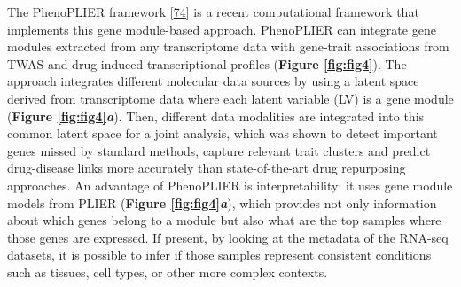 The PhenoPLIER framework {[}\protect\hyperlink{ref-NM3rHx1i}{74}{]} is a recent computational framework that implements this gene module-based approach.
PhenoPLIER can integrate gene modules extracted from any transcriptome data with gene-trait associations from TWAS and drug-induced transcriptional profiles (\textbf{Figure \ref{fig:fig4}}).
The approach integrates different molecular data sources by using a latent space derived from transcriptome data where each latent variable (LV) is a gene module (\textbf{Figure \ref{fig:fig4}\emph{a}}).
Then, different data modalities are integrated into this common latent space for a joint analysis, which was shown to detect important genes missed by standard methods, capture relevant trait clusters and predict drug-disease links more accurately than state-of-the-art drug repurposing approaches.
An advantage of PhenoPLIER is interpretability: it uses gene module models from PLIER (\textbf{Figure \ref{fig:fig4}\emph{a}}), which provides not only information about which genes belong to a module but also what are the top samples where those genes are expressed.
If present, by looking at the metadata of the RNA-seq datasets, it is possible to infer if those samples represent consistent conditions such as tissues, cell types, or other more complex contexts.

